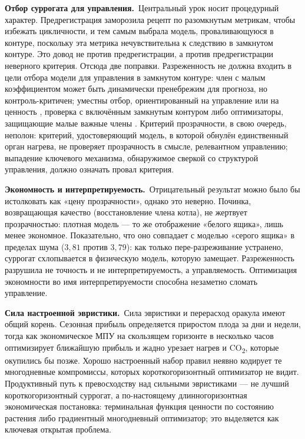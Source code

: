 \documentclass[preprint,3p]{elsarticle}
\begin{document}
\textbf{Отбор суррогата для управления.}~Центральный урок носит процедурный характер.
Предрегистрация заморозила рецепт по разомкнутым метрикам, чтобы избежать цикличности, и тем
самым выбрала модель, проваливающуюся в контуре, поскольку эта метрика нечувствительна к
следствию в замкнутом контуре. Это довод не против предрегистрации, а против предрегистрации
неверного критерия. Отсюда две поправки. Разреженность не должна входить в цели отбора модели
для управления в замкнутом контуре: член с малым коэффициентом может быть динамически
пренебрежим для прогноза, но контроль-критичен; уместны отбор, ориентированный на управление
или на ценность \citep{farahmand2017value,jacobiandmd2022}, проверка с включённым замкнутым
контуром либо оптимизаторы, защищающие малые важные члены
\citep{balanceguided2026,cortiella2021sparse}. Критерий прозрачности, в свою очередь, неполон:
критерий, удостоверяющий модель, в которой обнулён единственный орган нагрева, не проверяет
прозрачность в смысле, релевантном управлению; выпадение ключевого механизма, обнаружимое
сверкой со структурой управления, должно означать провал критерия.

\textbf{Экономность и интерпретируемость.}~Отрицательный результат можно было бы истолковать как
«цену прозрачности», однако это неверно. Починка, возвращающая качество (восстановление члена
котла), не жертвует прозрачностью: плотная модель — то же отображение «белого ящика», лишь менее
экономное. Показательно, что оно совпадает с моделью «серого ящика» в пределах шума ($3{,}81$
против $3{,}79$): как только пере-разреживание устранено, суррогат схлопывается в физическую
модель, которую замещает. Разреженность разрушила не точность и не интерпретируемость, а
управляемость. Оптимизация экономности во имя интерпретируемости способна незаметно сломать
управление.

\textbf{Сила настроенной эвристики.}~Сила эвристики и перерасход оракула имеют общий корень.
Сезонная прибыль определяется приростом плода за дни и недели, тогда как экономическое МПУ на
скользящем горизонте в несколько часов оптимизирует ближайшую прибыль и жадно урезает нагрев и
CO\textsubscript{2}, которые окупились бы позже. Хорошо настроенный набор правил неявно кодирует
те многодневные компромиссы, которых короткогоризонтный оптимизатор не видит. Продуктивный путь
к превосходству над сильными эвристиками — не лучший короткогоризонтный суррогат, а
по-настоящему длинногоризонтная экономическая постановка: терминальная функция ценности по
состоянию растения либо градиентный многодневный оптимизатор; это выделяется как ключевая
открытая проблема.
\end{document}
